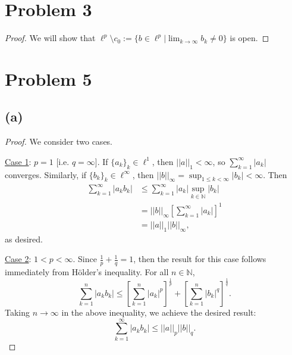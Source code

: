 \documentclass{article}
\begin{document}
\section*{Problem 3}
\begin{proof}
	We will show that $\ell^p \setminus c_0 := \{b\in\ell^p | \lim_{k \to\infty} b_k \neq 0\}$ is open. 
\end{proof}

\section*{Problem 5}
\subsection*{(a)}
\begin{proof}
	We consider two cases. 
	
	\underline{Case 1}: $p=1$ [i.e. $q=\infty$]. If $\{a_k\}_k\in\ell^1$, then $||a||_1 < \infty$, so $\sum_{k=1}^{\infty} |a_k|$ converges. Similarly, if $\{b_k\}_k\in\ell^{\infty}$, then $||b||_{\infty} = \sup_{1\leq k <  \infty}|b_k|<\infty$. Then
	\begin{align}
		\sum_{k=1}^{\infty}|a_k b_k| &\leq \sum_{k=1}^{\infty}|a_k|\sup_{k\in\mathbb{N}}|b_k| \\
		&= ||b||_{\infty}\left[\sum_{k=1}^{\infty}|a_k|\right]^1 \\
		&= ||a||_1||b||_{\infty},
	\end{align}
	as desired.
	
	\underline{Case 2}: $1<p<\infty$. Since $\frac{1}{p} + \frac{1}{q}=1$, then the result for this case follows immediately from Hölder's inequality. For all $n\in\mathbb{N}$, 
	\begin{equation}
		\sum_{k=1}^n |a_k b_k| \leq \left[\sum_{k=1}^n |a_k|^p\right]^\frac{1}{p} + \left[\sum_{k=1}^n |b_k|^q\right]^\frac{1}{q}.
	\end{equation}
	Taking $n\to\infty$ in the above inequality, we achieve the desired result:
	\begin{equation}
		\sum_{k=1}^{\infty} |a_k b_k| \leq ||a||_p||b||_q. 
	\end{equation}
\end{proof}
\end{document}
